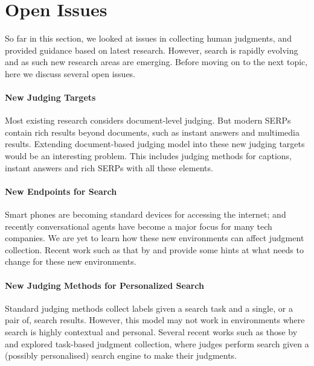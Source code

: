 \section{Open Issues}

So far in this section, we looked at issues in collecting human judgments, and provided guidance based on latest research. However, search is rapidly evolving and as such new research areas are emerging. Before moving on to the next topic, here we discuss several open issues.

\paragraph{New Judging Targets} Most existing research considers document-level judging. But modern SERPs contain rich results beyond documents, such as instant answers and multimedia results. Extending document-based judging model into these new judging targets would be an interesting problem. This includes judging methods for captions, instant answers and rich SERPs with all these elements.

\paragraph{New Endpoints for Search} Smart phones are becoming standard devices for accessing the internet; and recently conversational agents have become a major focus for many tech companies. We are yet to learn how these new environments can affect judgment collection. Recent work such as that by \cite{VermaY16} and \cite{Kiseleva:2016} provide some hints at what needs to change for these new environments.

\paragraph{New Judging Methods for Personalized Search} Standard judging methods collect labels given a search task and a single, or a pair of, search results. However, this model may not work in environments where search is highly contextual and personal. Several recent works such as  those by \cite{Xu:2009} and \cite{Moraveji:2011} explored task-based judgment collection, where judges perform search given a (possibly personalised) search engine to make their judgments. 
